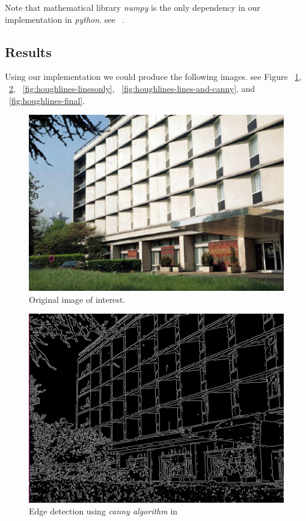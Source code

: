 \documentclass[letterpaper, 10 pt, conference ,onecolumn]{ieeeconf}  %
\begin{document}
Note that mathematical library \textit{numpy} is the only dependency in our implementation in \textit{python}. see ~.

\subsection*{Results}
Using our implementation we could produce the following images. see Figure ~\ref{fig:houghlines-origianl}, ~\ref{fig:houghlines-canny}, ~\ref{fig:houghlines-linesonly}, ~\ref{fig:houghlines-lines-and-canny}, and ~\ref{fig:houghlines-final}.
\begin{figure}[h!]
\includegraphics[width=0.4\paperwidth]{hough-lines/lines.jpg}
\caption{Original image of interest.}
\label{fig:houghlines-origianl}
\end{figure}

\begin{figure}[h!]
\includegraphics[width=0.4\paperwidth]{hough-lines/canny-image.jpg}
\caption{Edge detection using \textit{canny algorithm} in ~}
\label{fig:houghlines-canny}
\end{figure}
\end{document}
